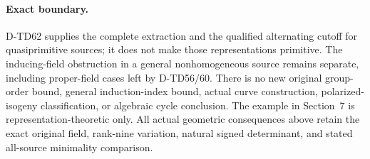 \paragraph{Exact boundary.}
D-TD62 supplies the complete extraction and the
qualified alternating cutoff for quasiprimitive
sources; it does not make those representations
primitive. The inducing-field obstruction in a
general nonhomogeneous source remains separate,
including proper-field cases left by D-TD56/60.
There is no new original group-order bound, general
induction-index bound, actual curve construction,
polarized-isogeny classification, or algebraic
cycle conclusion. The example in Section~7 is
representation-theoretic only. All actual geometric
consequences above retain the exact original field,
rank-nine variation, natural signed determinant,
and stated all-source minimality comparison.
